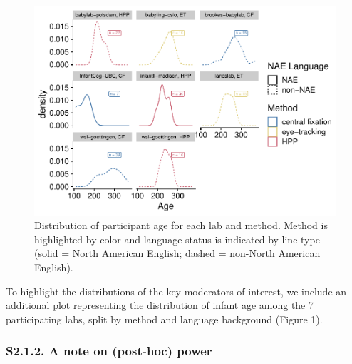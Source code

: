 \documentclass[
  english,
  man, donotrepeattitle,floatsintext]{apa6}
\begin{document}
\begin{figure}

{\centering \includegraphics{MB1T_supplement_files/figure-latex/fig1-1} 

}

\caption{Distribution of participant age for each lab and method. Method is highlighted by color and  language status is indicated by line type (solid = North American English; dashed = non-North American English).}\label{fig:fig1}
\end{figure}

To highlight the distributions of the key moderators of interest, we include an additional plot representing the distribution of infant age among the 7 participating labs, split by method and language background (Figure 1).

\hypertarget{s2.1.2.-a-note-on-post-hoc-power}{%
\subsubsection{S2.1.2. A note on (post-hoc) power}\label{s2.1.2.-a-note-on-post-hoc-power}}
\end{document}
